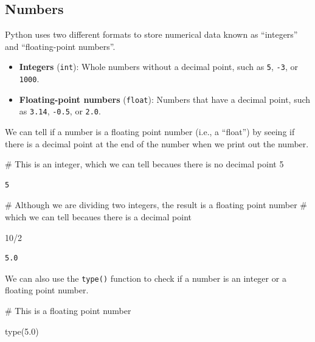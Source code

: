 \documentclass[
  letterpaper,
  DIV=11,
  numbers=noendperiod]{scrreprt}
\newenvironment{Shaded}{\begin{snugshade}}{\end{snugshade}}
\newcommand{\BuiltInTok}[1]{\textcolor[rgb]{0.00,0.23,0.31}{#1}}
\newcommand{\CommentTok}[1]{\textcolor[rgb]{0.37,0.37,0.37}{#1}}
\newcommand{\DecValTok}[1]{\textcolor[rgb]{0.68,0.00,0.00}{#1}}
\newcommand{\FloatTok}[1]{\textcolor[rgb]{0.68,0.00,0.00}{#1}}
\newcommand{\NormalTok}[1]{\textcolor[rgb]{0.00,0.23,0.31}{#1}}
\newcommand{\OperatorTok}[1]{\textcolor[rgb]{0.37,0.37,0.37}{#1}}
\providecommand{\tightlist}{%
  \setlength{\itemsep}{0pt}\setlength{\parskip}{0pt}}\usepackage{longtable,booktabs,array}
\begin{document}
\subsection{Numbers}\label{numbers}

Python uses two different formats to store numerical data known as
``integers'' and ``floating-point numbers''.

\begin{itemize}
\tightlist
\item
  \textbf{Integers} (\texttt{int}): Whole numbers without a decimal
  point, such as \texttt{5}, \texttt{-3}, or \texttt{1000}.
\item
  \textbf{Floating-point numbers} (\texttt{float}): Numbers that have a
  decimal point, such as \texttt{3.14}, \texttt{-0.5}, or \texttt{2.0}.
\end{itemize}

We can tell if a number is a floating point number (i.e., a ``float'')
by seeing if there is a decimal point at the end of the number when we
print out the number.

\begin{Shaded}
\begin{Highlighting}[]
\CommentTok{\# This is an integer, which we can tell becaues there is no decimal point}
\DecValTok{5}
\end{Highlighting}
\end{Shaded}

\begin{verbatim}
5
\end{verbatim}

\begin{Shaded}
\begin{Highlighting}[]
\CommentTok{\# Although we are dividing two integers, the result is a floating point number}
\CommentTok{\# which we can tell becaues there is a decimal point}

\DecValTok{10}\OperatorTok{/}\DecValTok{2}
\end{Highlighting}
\end{Shaded}

\begin{verbatim}
5.0
\end{verbatim}

We can also use the \texttt{type()} function to check if a number is an
integer or a floating point number.

\begin{Shaded}
\begin{Highlighting}[]
\CommentTok{\# This is a floating point number}

\BuiltInTok{type}\NormalTok{(}\FloatTok{5.0}\NormalTok{)}
\end{Highlighting}
\end{Shaded}
\end{document}
